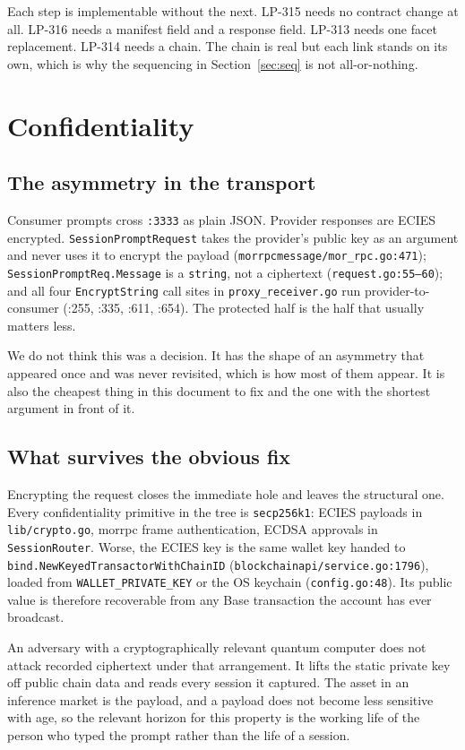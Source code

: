 \documentclass[11pt,a4paper]{article}
\newcommand{\code}[1]{\texttt{\small #1}}
\begin{document}
\noindent
Each step is implementable without the next. LP-315 needs no contract change at
all. LP-316 needs a manifest field and a response field. LP-313 needs one facet
replacement. LP-314 needs a chain. The chain is real but each link stands on its
own, which is why the sequencing in Section~\ref{sec:seq} is not all-or-nothing.

\section{Confidentiality}
\label{sec:conf}

\subsection{The asymmetry in the transport}

Consumer prompts cross \code{:3333} as plain JSON. Provider responses are ECIES
encrypted. \code{SessionPromptRequest} takes the provider's public key as an
argument and never uses it to encrypt the payload
(\code{morrpcmessage/mor\_rpc.go:471}); \code{SessionPromptReq.Message} is a
\code{string}, not a ciphertext (\code{request.go:55--60}); and all four
\code{EncryptString} call sites in \code{proxy\_receiver.go} run
provider-to-consumer (:255, :335, :611, :654). The protected half is the half
that usually matters less.

We do not think this was a decision. It has the shape of an asymmetry that
appeared once and was never revisited, which is how most of them appear. It is
also the cheapest thing in this document to fix and the one with the shortest
argument in front of it.

\subsection{What survives the obvious fix}

Encrypting the request closes the immediate hole and leaves the structural one.
Every confidentiality primitive in the tree is \code{secp256k1}: ECIES payloads
in \code{lib/crypto.go}, morrpc frame authentication, ECDSA approvals in
\code{SessionRouter}. Worse, the ECIES key is the same wallet key handed to
\code{bind.NewKeyedTransactorWithChainID}
(\code{blockchainapi/service.go:1796}), loaded from
\code{WALLET\_PRIVATE\_KEY} or the OS keychain (\code{config.go:48}). Its public
value is therefore recoverable from any Base transaction the account has ever
broadcast.

An adversary with a cryptographically relevant quantum computer does not attack
recorded ciphertext under that arrangement. It lifts the static private key off
public chain data and reads every session it captured. The asset in an inference
market is the payload, and a payload does not become less sensitive with age, so
the relevant horizon for this property is the working life of the person who
typed the prompt rather than the life of a session.
\end{document}
